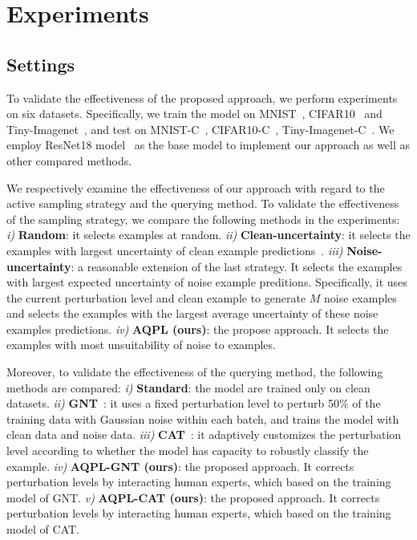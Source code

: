 \documentclass[letterpaper]{article} %
\begin{document}
\section{Experiments}

\subsection{Settings}
To validate the effectiveness of the proposed approach, we perform experiments on six datasets. Specifically, we train the model on MNIST~\cite{lecun1998gradient}, CIFAR10~\cite{krizhevsky2009learning} and Tiny-Imagenet~\cite{yao2015tiny}, and test on MNIST-C~\cite{mu2019mnist}, CIFAR10-C~\cite{hendrycks2019robustness}, Tiny-Imagenet-C~\cite{hendrycks2019robustness}. 
We employ ResNet18 model~\cite{he2016deep} as the base model to implement our approach as well as other compared methods. 

We respectively examine the effectiveness of our approach with regard to the active sampling strategy and the querying method. To validate the effectiveness of the sampling strategy, we compare the following methods in the experiments:
\emph{i)} \textbf{Random}: it selects examples at random.
\emph{ii)} \textbf{Clean-uncertainty}: it selects the examples with largest uncertainty of clean example predictions~\cite{lewis1994sequential}.
\emph{iii)} \textbf{Noise-uncertainty}: a reasonable extension of the last strategy. It selects the examples with largest expected uncertainty of noise example preditions. Specifically, it uses the current perturbation level and clean example to generate $M$ noise examples and selects the examples with the largest average uncertainty of these noise examples predictions.
\emph{iv)} \textbf{AQPL (ours)}: the propose approach. It selects the examples with most unsuitability of noise to examples.

Moreover, to validate the effectiveness of the querying method, the following methods are compared:
\emph{i)} \textbf{Standard}: the model are trained only on clean datasets.
\emph{ii)} \textbf{GNT}~\cite{rusak2020increasing}: it uses a fixed perturbation level to perturb 50\% of the training data with  Gaussian noise within each batch, and trains the model with clean data and noise data.
\emph{iii)} \textbf{CAT}~\cite{cheng2020cat}: it adaptively customizes the perturbation level according to whether the model has capacity to robustly classify the example.
\emph{iv)} \textbf{AQPL-GNT (ours)}: the proposed approach. It corrects perturbation levels by interacting human experts, which based on the training model of GNT.
\emph{v)} \textbf{AQPL-CAT (ours)}: the proposed approach. It corrects perturbation levels by interacting human experts, which based on the training model of CAT.
\end{document}
